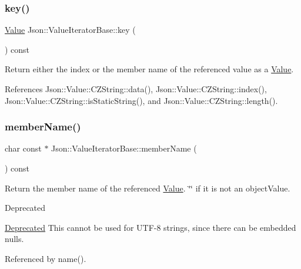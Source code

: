 \subsubsection{\texorpdfstring{key()}{key()}}
{\footnotesize\ttfamily \hyperlink{classJson_1_1Value}{Value} Json\+::\+Value\+Iterator\+Base\+::key (\begin{DoxyParamCaption}{ }\end{DoxyParamCaption}) const}

Return either the index or the member name of the referenced value as a \hyperlink{classJson_1_1Value}{Value}. 

References Json\+::\+Value\+::\+C\+Z\+String\+::data(), Json\+::\+Value\+::\+C\+Z\+String\+::index(), Json\+::\+Value\+::\+C\+Z\+String\+::is\+Static\+String(), and Json\+::\+Value\+::\+C\+Z\+String\+::length().

\mbox{\label{classJson_1_1ValueIteratorBase_a54765da6759fd3f1edcbfbaf308ec263_a54765da6759fd3f1edcbfbaf308ec263}} 
\subsubsection{\texorpdfstring{member\+Name()}{memberName()}\hspace{0.1cm}{\footnotesize\ttfamily [1/2]}}
{\footnotesize\ttfamily char const  $\ast$ Json\+::\+Value\+Iterator\+Base\+::member\+Name (\begin{DoxyParamCaption}{ }\end{DoxyParamCaption}) const}

Return the member name of the referenced \hyperlink{classJson_1_1Value}{Value}. \char`\"{}\char`\"{} if it is not an object\+Value. \begin{DoxyRefDesc}{Deprecated}
\item[\hyperlink{deprecated__deprecated000004}{Deprecated}]This cannot be used for U\+T\+F-\/8 strings, since there can be embedded nulls. \end{DoxyRefDesc}


Referenced by name().

\mbox{\label{classJson_1_1ValueIteratorBase_a391c9cbd0edf9a447b37df00e8ce6059_a391c9cbd0edf9a447b37df00e8ce6059}} 

